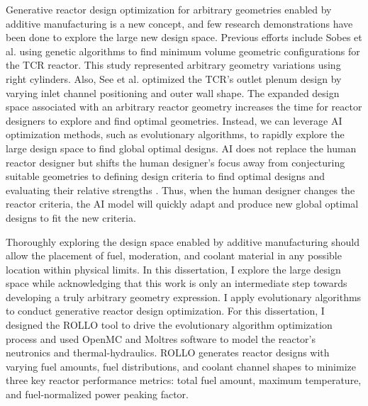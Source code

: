 Generative reactor design optimization for arbitrary geometries enabled by additive 
manufacturing is a new concept, and few research demonstrations have been done to 
explore the large new design space. 
Previous efforts include Sobes et al. \cite{sobes_artificial_2020} using genetic 
algorithms to find minimum volume geometric configurations for the TCR reactor. 
This study represented arbitrary geometry variations using right cylinders. 
Also, See et al. \cite{see_design_2022} optimized the TCR's outlet plenum design 
by varying inlet channel positioning and outer wall shape.  
The expanded design space associated with an arbitrary reactor geometry increases 
the time for reactor designers to explore and find optimal geometries. 
Instead, we can leverage \gls{AI} optimization methods, such as evolutionary algorithms, 
to rapidly explore the large design space to find global optimal designs. 
\gls{AI} does not replace the human reactor designer but shifts the human designer's 
focus away from conjecturing suitable geometries to defining design criteria to 
find optimal designs and evaluating their relative strengths \cite{sobes_artificial_2020}. 
Thus, when the human designer changes the reactor criteria, the AI model will quickly 
adapt and produce new global optimal designs to fit the new criteria.

Thoroughly exploring the design space enabled by additive manufacturing should allow 
the placement of fuel, moderation, and coolant material in any possible location 
within physical limits. 
In this dissertation, I explore the large design space while acknowledging that 
this work is only an intermediate step towards developing a truly arbitrary 
geometry expression. 
I apply evolutionary algorithms to conduct generative reactor design optimization. 
For this dissertation, I designed the \gls{ROLLO} tool \cite{chee_rollo_2021} to 
drive the evolutionary algorithm optimization process and used OpenMC 
\cite{romano_openmc:_2015} and Moltres \cite{lindsay_introduction_2018} software to 
model the reactor's neutronics and thermal-hydraulics. 
\gls{ROLLO} generates reactor designs with varying fuel amounts, fuel 
distributions, and coolant channel shapes to minimize three key reactor performance 
metrics: total fuel amount, maximum temperature, and fuel-normalized power peaking 
factor. 

